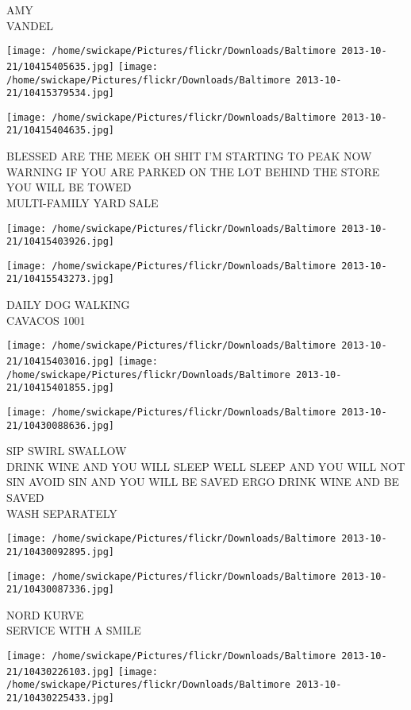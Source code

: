 \documentclass[10pt,letterpaper]{article}
\begin{document}
AMY\\
VANDEL
\pagebreak

\texttt{[image: /home/swickape/Pictures/flickr/Downloads/Baltimore 2013-10-21/10415405635.jpg]}
\texttt{[image: /home/swickape/Pictures/flickr/Downloads/Baltimore 2013-10-21/10415379534.jpg]}

\texttt{[image: /home/swickape/Pictures/flickr/Downloads/Baltimore 2013-10-21/10415404635.jpg]}

BLESSED ARE THE MEEK OH SHIT I'M STARTING TO PEAK NOW\\
WARNING IF YOU ARE PARKED ON THE LOT BEHIND THE STORE YOU WILL BE TOWED\\
MULTI{-}FAMILY YARD SALE
\pagebreak

\texttt{[image: /home/swickape/Pictures/flickr/Downloads/Baltimore 2013-10-21/10415403926.jpg]}

\vspace{0.25in}
\texttt{[image: /home/swickape/Pictures/flickr/Downloads/Baltimore 2013-10-21/10415543273.jpg]}

DAILY DOG WALKING\\
CAVACOS 1001
\pagebreak

\texttt{[image: /home/swickape/Pictures/flickr/Downloads/Baltimore 2013-10-21/10415403016.jpg]}
\texttt{[image: /home/swickape/Pictures/flickr/Downloads/Baltimore 2013-10-21/10415401855.jpg]}

\vspace{0.25in}
\texttt{[image: /home/swickape/Pictures/flickr/Downloads/Baltimore 2013-10-21/10430088636.jpg]}

SIP SWIRL SWALLOW\\
DRINK WINE AND YOU WILL SLEEP WELL SLEEP AND YOU WILL NOT SIN AVOID SIN AND YOU WILL BE SAVED ERGO DRINK WINE AND BE SAVED\\
WASH SEPARATELY
\pagebreak

\texttt{[image: /home/swickape/Pictures/flickr/Downloads/Baltimore 2013-10-21/10430092895.jpg]}

\vspace{0.25in}
\texttt{[image: /home/swickape/Pictures/flickr/Downloads/Baltimore 2013-10-21/10430087336.jpg]}

NORD KURVE\\
SERVICE WITH A SMILE
\pagebreak

\texttt{[image: /home/swickape/Pictures/flickr/Downloads/Baltimore 2013-10-21/10430226103.jpg]}
\texttt{[image: /home/swickape/Pictures/flickr/Downloads/Baltimore 2013-10-21/10430225433.jpg]}
\end{document}
